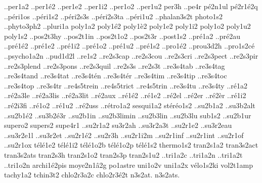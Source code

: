 {..per1a2
..per1^^e92
..per1e2
..per1i2
..per1o2
..per1u2
per3h
..pe4r
p^^e92n1ul
p^^e92r1^^e92q
..p^^e9ri1os
..p^^e9ri1s2
..p^^e9ri2s3s
..p^^e9ri2s3ta
..p^^e9ri1u2
..phalan3s2t
photo1s2
..phyto3ph2
..pluri1a
poly1a2
poly1^^e92
poly1^^e82
poly1e2
poly1i2
poly1o2
poly1u2
poly1s2
..pos2t3hy
..pos2t1in
..pos2t1o2
..pos2t3r
..post1s2
..pr^^e91a2
..pr^^e92au
..pr^^e91^^e92
..pr^^e91e2
..pr^^e91i2
..pr^^e91o2
..pr^^e91u2
..pr^^e91s2
..pro1^^e92
..prou3d2h
..pro1s2c^^e9
..psycho1a2n
..pud1d2l
..re1s2
..re2s3cap
..re2s3cou
..re2s3cri
..re2s3pect
..re2s3pir
..re2s3plend
..re2s3pons
..re2s3quil
..re2s3s
..re2s3t
..re3s4tab
..re3s4tag
..re3s4tand
..re3s4tat
..re3s4t^^e9n
..re3s4t^^e9r
..re3s4tim
..re3s4tip
..re3s4toc
..re3s4top
..re3s4tr
..re4s5trein
..re4s5trict
..re4s5trin
..re3s4tu
..re3s4ty
..r^^e91a2
..r^^e92a3le
..r^^e92a3lis
..r^^e92a3lit
..r^^e92aux
..r^^e91^^e92
..r^^e91e2
..r^^e92el
..r^^e92er
..r^^e92^^e8r
..r^^e91i2
..r^^e92i3fi
..r^^e91o2
..r^^e91u2
..r^^e92uss
..r^^e9tro1a2
sesqui1a2
st^^e9r^^e9o1s2
..su2b1a2
..su3b2alt
..su2b1^^e92
..su3b2^^e93r
..su2b1in
..su2b3limin
..su2b3lin
..su2b3lu
sub1s2
..su2b1ur
supero2
supers2
supe4r1
..su2r1a2
su3r2ah
..su3r2a3t
..su2r1e2
..su3r2eau
..su3r2e1l
..su3r2et
..su2r1^^e92
..su2r3h
..su2r1i2m
..su2r1inf
..su2r1int
..su2r1of
..su2r1ox
t^^e9l^^e91e2
t^^e9l^^e91i2
t^^e9l^^e91o2b
t^^e9l^^e91o2p
t^^e9l^^e91s2
thermo1s2
tran2s1a2
tran3s2act
tran3s2ats
tran2s3h
tran2s1o2
tran2s3p
tran2s1u2
..tri1a2c
..tri1a2n
..tri1a2t
..tri1o2n
archi1^^e92pis
moye2n1^^e22g
po1astre
uni1o2v
uni1a2x
v^^e9lo1s2ki
vol2t1amp
tachy1a2
tchin3t2
chlo2r3a2c
chlo2r3^^e92t
n3s2at.
n3s2ats.
}


